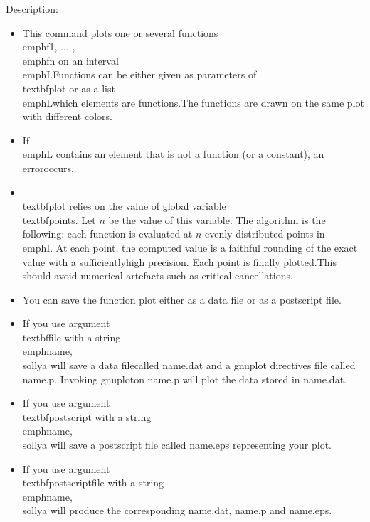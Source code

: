 \noindent Description: \begin{itemize}

\item This command plots one or several functions \\emph{f1}, ... ,\\emph{fn} on an interval \\emph{I}.\n   Functions can be either given as parameters of \\textbf{plot} or as a list \\emph{L}\n   which elements are functions.\n   The functions are drawn on the same plot with different colors.\n
\item If \\emph{L} contains an element that is not a function (or a constant), an error\n   occurs.\n
\item \\textbf{plot} relies on the value of global variable \\textbf{points}. Let $n$ be the \n   value of this variable. The algorithm is the following: each function is \n   evaluated at $n$ evenly distributed points in \\emph{I}. At each point, the \n   computed value is a faithful rounding of the exact value with a sufficiently\n   high precision. Each point is finally plotted.\n   This should avoid numerical artefacts such as critical cancellations.\n
\item You can save the function plot either as a data file or as a postscript file.\n
\item If you use argument \\textbf{file} with a string \\emph{name}, \\sollya will save a data file\n   called name.dat and a gnuplot directives file called name.p. Invoking gnuplot\n   on name.p will plot the data stored in name.dat.\n
\item If you use argument \\textbf{postscript} with a string \\emph{name}, \\sollya will save a \n   postscript file called name.eps representing your plot.\n
\item If you use argument \\textbf{postscriptfile} with a string \\emph{name}, \\sollya will \n   produce the corresponding name.dat, name.p and name.eps.\n

\end{itemize}
